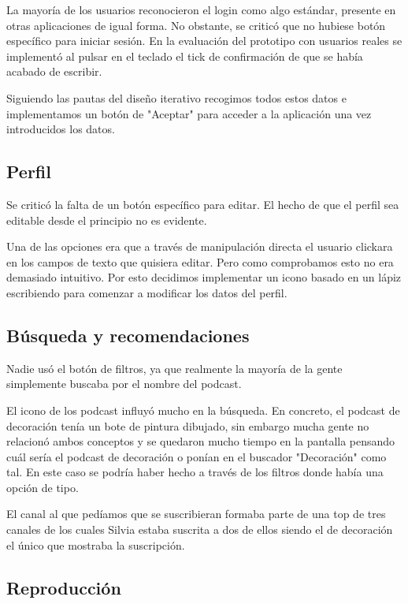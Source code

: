 \documentclass[a4paper]{article}
\begin{document}
La mayoría de los usuarios reconocieron el login como algo estándar, presente en otras aplicaciones de igual forma. No obstante, se criticó que no hubiese botón específico para iniciar sesión. En la evaluación del prototipo con usuarios reales se implementó al pulsar en el teclado el tick de confirmación de que se había acabado de escribir.

Siguiendo las pautas del diseño iterativo recogimos todos estos datos e implementamos un botón de "Aceptar" para acceder a la aplicación una vez introducidos los datos.

\subsection{Perfil}

Se criticó la falta de un botón específico para editar. El hecho de que el perfil sea editable desde el principio no es evidente.

Una de las opciones era que a través de manipulación directa el usuario clickara en los campos de texto que quisiera editar. Pero como comprobamos esto no era demasiado intuitivo. Por esto decidimos implementar un icono basado en un lápiz escribiendo para comenzar a modificar los datos del perfil. 

\subsection{Búsqueda y recomendaciones}

Nadie usó el botón de filtros, ya que realmente la mayoría de la gente simplemente buscaba por el nombre del podcast.

El icono de los podcast influyó mucho en la búsqueda. En concreto, el podcast de decoración tenía un bote de pintura dibujado, sin embargo mucha gente no relacionó ambos conceptos y se quedaron mucho tiempo en la pantalla pensando cuál sería el podcast de decoración o ponían en el buscador "Decoración" como tal. En este caso se podría haber hecho a través de los filtros donde había una opción de tipo.

El canal al que pedíamos que se suscribieran formaba parte de una top de tres canales de los cuales Silvia estaba suscrita a dos de ellos siendo el de decoración el único que mostraba la suscripción.

\subsection{Reproducción}
\end{document}
